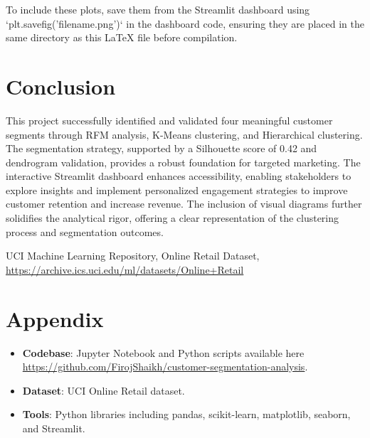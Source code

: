 \documentclass[a4paper,12pt]{article}
\begin{document}
To include these plots, save them from the Streamlit dashboard using `plt.savefig('filename.png')` in the dashboard code, ensuring they are placed in the same directory as this LaTeX file before compilation.

\section{Conclusion}

This project successfully identified and validated four meaningful customer segments through RFM analysis, K-Means clustering, and Hierarchical clustering. The segmentation strategy, supported by a Silhouette score of 0.42 and dendrogram validation, provides a robust foundation for targeted marketing. The interactive Streamlit dashboard enhances accessibility, enabling stakeholders to explore insights and implement personalized engagement strategies to improve customer retention and increase revenue. The inclusion of visual diagrams further solidifies the analytical rigor, offering a clear representation of the clustering process and segmentation outcomes.

\begin{thebibliography}{9}
 UCI Machine Learning Repository, Online Retail Dataset, \url{https://archive.ics.uci.edu/ml/datasets/Online+Retail}
\end{thebibliography}

\appendix
\section{Appendix}

\begin{itemize}
    \item \textbf{Codebase}: Jupyter Notebook and Python scripts available here \url{https://github.com/FirojShaikh/customer-segmentation-analysis}.
    \item \textbf{Dataset}: UCI Online Retail dataset.
    \item \textbf{Tools}: Python libraries including pandas, scikit-learn, matplotlib, seaborn, and Streamlit.
\end{itemize}
\end{document}
